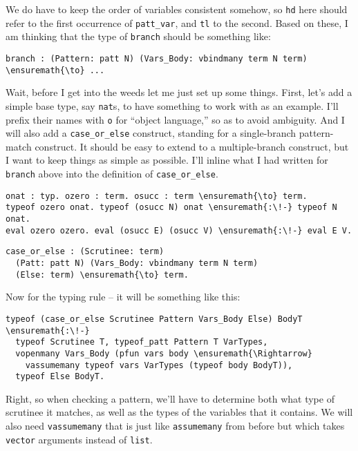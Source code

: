 We do have to keep the order of variables consistent somehow, so
\texttt{hd} here should refer to the first occurrence of
\texttt{patt\_var}, and \texttt{tl} to the second. Based on these, I am
thinking that the type of \texttt{branch} should be something like:

\begin{verbatim}
branch : (Pattern: patt N) (Vars_Body: vbindmany term N term) \ensuremath{\to} ...
\end{verbatim}

Wait, before I get into the weeds let me just set up some things. First,
let's add a simple base type, say \texttt{nat}s, to have something to
work with as an example. I'll prefix their names with \texttt{o} for
``object language,'' so as to avoid ambiguity. And I will also add a
\texttt{case\_or\_else} construct, standing for a single-branch
pattern-match construct. It should be easy to extend to a
multiple-branch construct, but I want to keep things as simple as
possible. I'll inline what I had written for \texttt{branch} above into
the definition of \texttt{case\_or\_else}.

\begin{verbatim}
onat : typ. ozero : term. osucc : term \ensuremath{\to} term.
typeof ozero onat. typeof (osucc N) onat \ensuremath{:\!-} typeof N onat.
eval ozero ozero. eval (osucc E) (osucc V) \ensuremath{:\!-} eval E V.
\end{verbatim}

\begin{verbatim}
case_or_else : (Scrutinee: term)
  (Patt: patt N) (Vars_Body: vbindmany term N term)
  (Else: term) \ensuremath{\to} term.
\end{verbatim}

Now for the typing rule -- it will be something like this:

\begin{verbatim}
typeof (case_or_else Scrutinee Pattern Vars_Body Else) BodyT \ensuremath{:\!-}
  typeof Scrutinee T, typeof_patt Pattern T VarTypes,
  vopenmany Vars_Body (pfun vars body \ensuremath{\Rightarrow}
    vassumemany typeof vars VarTypes (typeof body BodyT)),
  typeof Else BodyT.
\end{verbatim}

Right, so when checking a pattern, we'll have to determine both what
type of scrutinee it matches, as well as the types of the variables that
it contains. We will also need \texttt{vassumemany} that is just like
\texttt{assumemany} from before but which takes \texttt{vector}
arguments instead of \texttt{list}.

